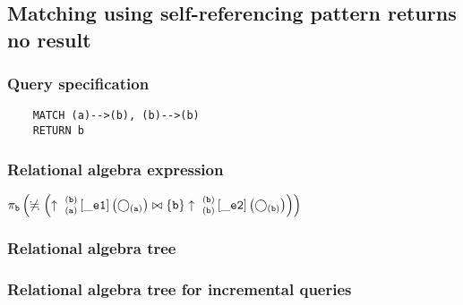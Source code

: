 	\subsection{Matching using self-referencing pattern returns no result}

	\subsubsection*{Query specification}

	\begin{lstlisting}
	MATCH (a)-->(b), (b)-->(b)
	RETURN b
	\end{lstlisting}


	\subsubsection*{Relational algebra expression}

	$\projection{\var{b}} \left(\alldifferent{} \left(\expandout{a}{b}{}{\_e1}{} \left(\getvertices{a}{}\right) \join \{\var{b}\} \expandout{b}{b}{}{\_e2}{} \left(\getvertices{b}{}\right)\right)\right)$

	\subsubsection*{Relational algebra tree}


	\subsubsection*{Relational algebra tree for incremental queries}

